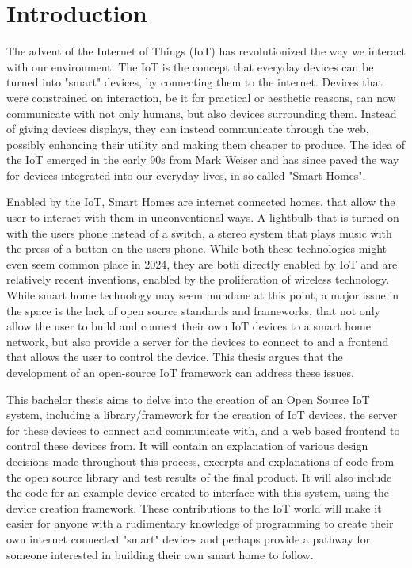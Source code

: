 \chapter{Introduction} \label{cha:intro}
The advent of the Internet of Things (IoT) has revolutionized the way we interact with our environment. The IoT is the concept that everyday devices can be turned into "smart" devices, by connecting them to the internet. Devices that were constrained on interaction, be it for practical or aesthetic reasons, can now communicate with not only humans, but also devices surrounding them. Instead of giving devices displays, they can instead communicate through the web, possibly enhancing their utility and making them cheaper to produce. The idea of the IoT emerged in the early 90s from Mark Weiser \cite{FromInternetToIot} and has since paved the way for devices integrated into our everyday lives, in so-called "Smart Homes".

Enabled by the IoT, Smart Homes are internet connected homes, that allow the user to interact with them in unconventional ways. A lightbulb that is turned on with the users phone instead of a switch, a stereo system that plays music with the press of a button on the users phone. While both these technologies might even seem common place in 2024, they are both directly enabled by IoT and are relatively recent inventions, enabled by the proliferation of wireless technology. While smart home technology may seem mundane at this point, a major issue in the space is the lack of open source standards and frameworks, that not only allow the user to build and connect their own IoT devices to a smart home network, but also provide a server for the devices to connect to and a frontend that allows the user to control the device. This thesis argues that the development of an open-source IoT framework can address these issues.

This bachelor thesis aims to delve into the creation of an Open Source IoT system, including a library/framework for the creation of IoT devices, the server for these devices to connect and communicate with, and a web based frontend to control these devices from. It will contain an explanation of various design decisions made throughout this process, excerpts and explanations of code from the open source library and test results of the final product. It will also include the code for an example device created to interface with this system, using the device creation framework. These contributions to the IoT world will make it easier for anyone with a rudimentary knowledge of programming to create their own internet connected "smart" devices and perhaps provide a pathway for someone interested in building their own smart home to follow.    

